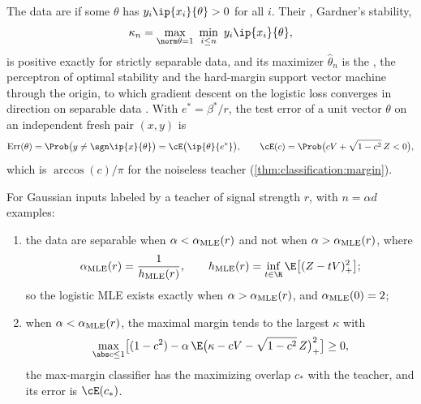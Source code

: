\begin{refsection}
The data are  if some $\theta$ has $y_i\ip{x_i}{\theta}>0$ for all $i$. Their , Gardner's stability,
\[
\kappa_n=\max_{\norm\theta=1}\ \min_{i\le n}\ y_i\ip{x_i}{\theta},
\]
is positive exactly for strictly separable data, and its maximizer $\hat\theta_n$ is the , the perceptron of optimal stability and the hard-margin support vector machine through the origin, to which gradient descent on the logistic loss converges in direction on separable data \parencite{SoudryEtAl2018}. With $e^*=\beta^*/r$, the test error of a unit vector $\theta$ on an independent fresh pair $(x,y)$ is
\[
\classificationerr(\theta)=\Prob\bigl(y\ne\sgn\ip{x}{\theta}\bigr)=\cE\bigl(\ip{\theta}{e^*}\bigr),\qquad\cE(c)=\Prob\bigl(cV+\sqrt{1-c^2}\,Z<0\bigr),
\]
which is $\arccos(c)/\pi$ for the noiseless teacher (\cref{thm:classification:margin}).

\begin{physicsbox}
For Gaussian inputs labeled by a teacher of signal strength $r$, with $n=\alpha d$ examples:
\begin{enumerate}
\item the data are separable when $\alpha<\alpha_{\mathrm{MLE}}(r)$ and not when $\alpha>\alpha_{\mathrm{MLE}}(r)$, where
\begin{equation}\label{eq:classification:threshold}
\classificationa(r)=\frac1{\classificationh(r)},\qquad\classificationh(r)=\inf_{t\in\R}\E\bigl[(Z-tV)_+^2\bigr];
\end{equation}
so the logistic MLE exists exactly when $\alpha>\alpha_{\mathrm{MLE}}(r)$, and $\alpha_{\mathrm{MLE}}(0)=2$;
\item when $\alpha<\alpha_{\mathrm{MLE}}(r)$, the maximal margin tends to the largest $\kappa$ with
\begin{equation}\label{eq:classification:margin}
\max_{\abs c\le1}\bigl[(1-c^2)-\alpha\,\E\bigl(\kappa-cV-\sqrt{1-c^2}\,Z\bigr)_+^2\bigr]\ge0,
\end{equation}
the max-margin classifier has the maximizing overlap $c_*$ with the teacher, and its error is $\cE(c_*)$.
\end{enumerate}
\end{physicsbox}


\end{refsection}
